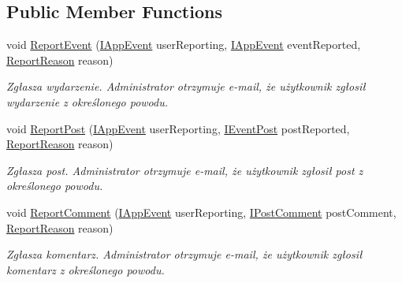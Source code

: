 \subsection*{Public Member Functions}
\begin{DoxyCompactItemize}
\item 
void \hyperlink{class_bibabook_1_1_implementation_1_1_report_service_1_1_report_inappropriate_content_service_a982d00d4c303fa7dbb15e456bad5da38}{Report\+Event} (\hyperlink{interface_contract_1_1_i_app_event}{I\+App\+Event} user\+Reporting, \hyperlink{interface_contract_1_1_i_app_event}{I\+App\+Event} event\+Reported, \hyperlink{namespace_contract_ac533e9a5fffe5319dcbdc2388bc54715}{Report\+Reason} reason)
\begin{DoxyCompactList}\small\item\em Zgłasza wydarzenie. Administrator otrzymuje e-\/mail, że użytkownik zgłosił wydarzenie z określonego powodu. \end{DoxyCompactList}\item 
void \hyperlink{class_bibabook_1_1_implementation_1_1_report_service_1_1_report_inappropriate_content_service_af3a633a947cc6ad5ce342e4687235dbd}{Report\+Post} (\hyperlink{interface_contract_1_1_i_app_event}{I\+App\+Event} user\+Reporting, \hyperlink{interface_contract_1_1_i_event_post}{I\+Event\+Post} post\+Reported, \hyperlink{namespace_contract_ac533e9a5fffe5319dcbdc2388bc54715}{Report\+Reason} reason)
\begin{DoxyCompactList}\small\item\em Zgłasza post. Administrator otrzymuje e-\/mail, że użytkownik zgłosił post z określonego powodu. \end{DoxyCompactList}\item 
void \hyperlink{class_bibabook_1_1_implementation_1_1_report_service_1_1_report_inappropriate_content_service_a74b76271113ba71fee324a2903942061}{Report\+Comment} (\hyperlink{interface_contract_1_1_i_app_event}{I\+App\+Event} user\+Reporting, \hyperlink{interface_contract_1_1_i_post_comment}{I\+Post\+Comment} post\+Comment, \hyperlink{namespace_contract_ac533e9a5fffe5319dcbdc2388bc54715}{Report\+Reason} reason)
\begin{DoxyCompactList}\small\item\em Zgłasza komentarz. Administrator otrzymuje e-\/mail, że użytkownik zgłosił komentarz z określonego powodu. \end{DoxyCompactList}\end{DoxyCompactItemize}


